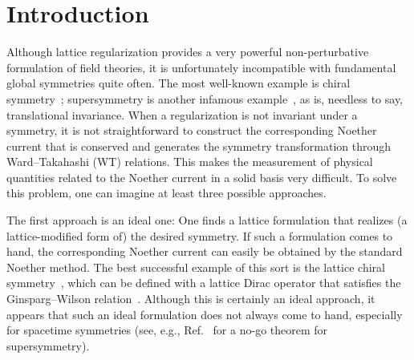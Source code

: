 \section{Introduction}
\label{sec:1}
Although lattice regularization provides a very powerful non-perturbative
formulation of field theories, it is unfortunately incompatible with
fundamental global symmetries quite often. The most well-known example is
chiral symmetry~\cite{Nielsen:1980rz,Nielsen:1981xu}; supersymmetry is another
infamous example~\cite{Dondi:1976tx}, as is, needless to say, translational
invariance. When a regularization is not invariant under a symmetry, it is not
straightforward to construct the corresponding Noether current that is
conserved and generates the symmetry transformation through Ward--Takahashi
(WT) relations. This makes the measurement of physical quantities related to
the Noether current in a solid basis very difficult. To solve this problem, one
can imagine at least three possible approaches.

The first approach is an ideal one: One finds a lattice formulation that
realizes (a lattice-modified form of) the desired symmetry. If such a
formulation comes to hand, the corresponding Noether current can easily be
obtained by the standard Noether method. The best successful example of this
sort is the lattice chiral symmetry~\cite{Kaplan:1992bt,Neuberger:1997fp,%
Hasenfratz:1997ft,Hasenfratz:1998ri,Neuberger:1998wv,Hasenfratz:1998jp,%
Luscher:1998pqa,Niedermayer:1998bi}, which can be defined with a lattice Dirac
operator that satisfies the Ginsparg--Wilson relation~\cite{Ginsparg:1981bj}.
Although this is certainly an ideal approach, it appears that such an ideal
formulation does not always come to hand, especially for spacetime symmetries
(see, e.g., Ref.~\cite{Kato:2008sp} for a no-go theorem for supersymmetry).

